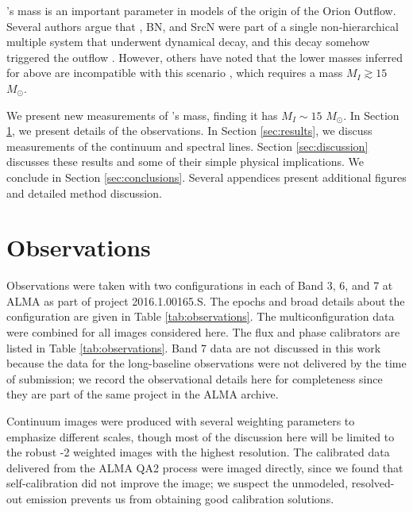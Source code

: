 \documentclass[twocolumn]{aastex61}
\newcommand{\msun}{\ensuremath{M_{\odot}}\xspace}			%
\newcommand{\sourcen}{SrcN\xspace}
\newcommand{\sourcex}{SrcX\xspace}
\begin{document}

\sourcei's mass is an important parameter in models of the origin of the Orion
Outflow.
Several authors argue that \sourcei, BN, and \sourcen \citep[or, alternatively,
\sourcex;][]{Luhman2017a} were part of a single non-hierarchical multiple system
that underwent dynamical decay, and this decay somehow triggered the outflow
\citep{Bally2005a,Rodriguez2005a,Goddi2011b,Moeckel2012b,Bally2011a,Bally2015a,Bally2017a,Rodriguez2017a}.
However, others have
noted that the lower masses inferred for \sourcei above are incompatible with
this scenario \citep{Chatterjee2012a,Plambeck2016a,Farias2017b}, which requires
a mass $M_{I} \gtrsim 15$ \msun.

We present new measurements of \sourcei's mass, finding it has $M_I \sim 15$ \msun.
In Section \ref{sec:observations}, we present details of the observations.
In Section \ref{sec:results}, we discuss measurements of the continuum
and spectral lines.  Section \ref{sec:discussion} discusses these results and
some of their simple physical implications.
We conclude in Section \ref{sec:conclusions}.
Several appendices present additional figures and detailed method discussion.


\section{Observations}
\label{sec:observations}

Observations were taken with two configurations in each of Band 3, 6, and 7 at
ALMA as part of project 2016.1.00165.S.  The epochs and broad details about the
configuration are given in Table \ref{tab:observations}.  The
multiconfiguration data were combined for all
images considered here.
The flux and phase calibrators are listed in Table \ref{tab:observations}.
Band 7 data are not discussed in this work because the data for
the long-baseline observations were not delivered by the time of submission; we
record the observational details here for completeness since they are part of
the same project in the ALMA archive.

Continuum images were produced with several weighting parameters to emphasize
different scales, though most of the discussion here will be limited to the
robust -2 weighted images with the highest resolution.  The calibrated data
delivered from the ALMA QA2 process were imaged directly, since we found
that self-calibration did not improve the image; we suspect the unmodeled, resolved-out
emission prevents us from obtaining good calibration solutions.
\end{document}
